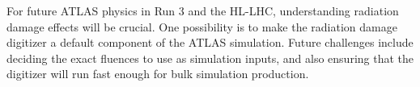 
For future ATLAS physics in Run 3 and the HL-LHC, understanding radiation damage effects will be crucial. One possibility is to make the radiation damage digitizer a default component of the ATLAS simulation. Future challenges include deciding the exact fluences to use as simulation inputs, and also ensuring that the digitizer will run fast enough for bulk simulation production. 
 


